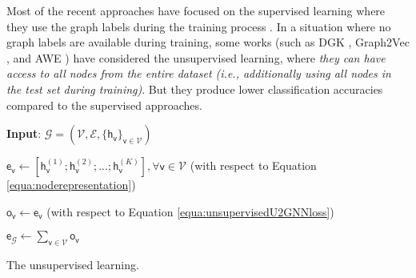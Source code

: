 \documentclass[twoside,leqno,twocolumn]{article}
\newcommand{\citep}{\cite}
\begin{document}
Most of the recent approaches have focused on the supervised learning where they use the graph labels during the training process \citep{xinyi2019capsule,xu2019powerful,Chen2019ArePG,maron2019invariant,seo2019discriminative}.
In a situation where {no graph labels are available during training}, some works (such as DGK \citep{yanardag2015deep}, Graph2Vec \citep{narayanan2017graph2vec}, and AWE \citep{ivanov2018anonymous}) have considered the unsupervised learning, where \textit{they can have access to all nodes from the entire dataset (i.e., additionally using all nodes in the test set during training)}.
But they produce lower classification accuracies compared to the supervised approaches.

\begin{algorithm}
\DontPrintSemicolon
\SetAlgoVlined
\textbf{Input}: $\mathcal{G} = \left(\mathcal{V}, \mathcal{E}, \{\boldsymbol{\mathsf{h}}_\mathsf{v}\}_{\mathsf{v} \in \mathcal{V}}\right)$


$\boldsymbol{\mathsf{e}}_\mathsf{v} \leftarrow \left[\boldsymbol{\mathsf{h}}_\mathsf{v}^{(1)}; \boldsymbol{\mathsf{h}}_\mathsf{v}^{(2)}; ...; \boldsymbol{\mathsf{h}}_\mathsf{v}^{(K)}\right] , \forall \mathsf{v} \in \mathcal{V}$ (with respect to Equation \ref{equa:noderepresentation})

$\boldsymbol{\mathsf{o}}_{\mathsf{v}} \leftarrow \boldsymbol{\mathsf{e}}_\mathsf{v}$ (with respect to Equation \ref{equa:unsupervisedU2GNNloss})

$\boldsymbol{\mathsf{e}}_{\mathcal{G}} \leftarrow \sum_{\mathsf{v} \in \mathcal{V}}\boldsymbol{\mathsf{o}}_\mathsf{v}$

\caption{The unsupervised learning.}
\label{alg:U2GNNunsup}
\end{algorithm}
\end{document}
